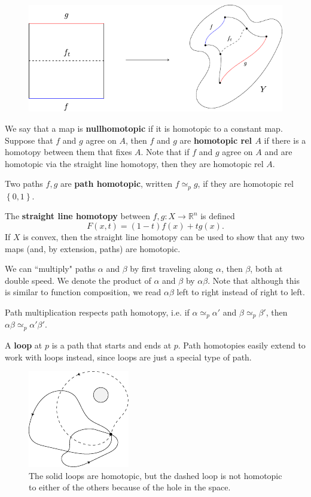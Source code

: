 \documentclass[twoside,10pt]{report}
\begin{document}
\begin{figure}[H]
	\centering
	\includegraphics[scale=1]{fig/homotopy.pdf}
\end{figure}

We say that a map is \textbf{nullhomotopic} if it is homotopic to a constant map. Suppose that $f$ and $g$ agree on $A$, then $f$ and $g$ are \textbf{homotopic rel $A$} if there is a homotopy between them that fixes $A$. Note that if $f$ and $g$ agree on $A$ and are homotopic via the straight line homotopy, then they are homotopic rel $A$.

\begin{defn}[]
Two paths $f,g$ are \textbf{path homotopic}, written $f \simeq_p g$, if they are homotopic rel $\left\{ 0,1 \right\}$.
\end{defn}

The \textbf{straight line homotopy} between $f,g:X\to \mathbb{R}^{n}$ is defined
\[
	F(x,t) = (1-t)f(x)+tg(x).
\] 
If $X$ is convex, then the straight line homotopy can be used to show that any two maps (and, by extension, paths) are homotopic.

We can ``multiply" paths $\alpha$ and $\beta$ by first traveling along $\alpha$, then $\beta$, both at double speed. We denote the product of $\alpha$ and $\beta$ by $\alpha\beta$. Note that although this is similar to function composition, we read $\alpha\beta$ left to right instead of right to left.

\begin{prop}
Path multiplication respects path homotopy, i.e. if $\alpha \simeq_p \alpha'$ and $\beta \simeq_p \beta'$, then $\alpha\beta \simeq_{p} \alpha'\beta'$.
\end{prop}

A \textbf{loop} at $p$ is a path that starts and ends at $p$. Path homotopies easily extend to work with loops instead, since loops are just a special type of path.

\begin{figure}[H]
	\centering
	\includegraphics[scale=1.5]{fig/homotopic.pdf}
	\caption{The solid loops are homotopic, but the dashed loop is not homotopic to either of the others because of the hole in the space.}
\end{figure}
\end{document}
